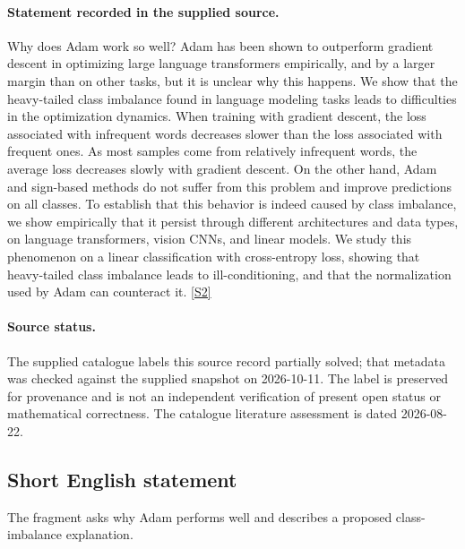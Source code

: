 \documentclass[11pt]{article}
\newcommand{\sref}[2]{\hyperlink{source:#1:#2}{[S#2]}}
\begin{document}
\paragraph{Statement recorded in the supplied source.}
Why does Adam work so well? Adam has been shown to outperform gradient descent in optimizing large language transformers empirically, and by a larger margin than on other tasks, but it is unclear why this happens. We show that the heavy-tailed class imbalance found in language modeling tasks leads to difficulties in the optimization dynamics. When training with gradient descent, the loss associated with infrequent words decreases slower than the loss associated with frequent ones. As most samples come from relatively infrequent words, the average loss decreases slowly with gradient descent. On the other hand, Adam and sign-based methods do not suffer from this problem and improve predictions on all classes. To establish that this behavior is indeed caused by class imbalance, we show empirically that it persist through different architectures and data types, on language transformers, vision CNNs, and linear models. We study this phenomenon on a linear classification with cross-entropy loss, showing that heavy-tailed class imbalance leads to ill-conditioning, and that the normalization used by Adam can counteract it. \sref{30006177}{2}
\paragraph{Source status.}
The supplied catalogue labels this source record partially solved; that metadata was checked against the supplied snapshot on 2026-10-11. The label is preserved for provenance and is not an independent verification of present open status or mathematical correctness. The catalogue literature assessment is dated 2026-08-22.
\subsection{Short English statement}
The fragment asks why Adam performs well and describes a proposed class-imbalance explanation.
\end{document}

